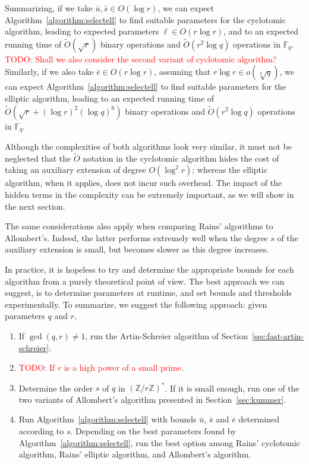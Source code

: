 \documentclass[12pt]{article}
\theoremstyle{plain}
\theoremstyle{definition}
\newcommand{\tildO}{\tilde{O}}
\newcommand{\todo}[1]{\textcolor{red}{TODO: #1}}
\def\Z{\ensuremath{\mathbb{Z}}}
\def\F{\ensuremath{\mathbb{F}}}
\newcounter{algorithm}
\begin{document}
Summarizing, if we take $\bar{u},\bar{s}\in O(\log r)$, we can expect
Algorithm~\ref{algorithm:selectell} to find suitable parameters for
the cyclotomic algorithm, leading to expected parameters $\ell\in
O(r\log r)$, and to an expected running time of $\tildO(\sqrt{r})$
binary operations and $\tildO(r^2\log q)$ operations in
$\F_q$. \todo{Shall we also consider the second variant of cyclotomic
  algorithm?} Similarly, if we also take $\bar{e}\in O(r\log r)$,
assuming that $r\log r\in o(\sqrt[4]{q})$, we can expect
Algorithm~\ref{algorithm:selectell} to find suitable parameters for
the elliptic algorithm, leading to an expected running time of
$\tildO(\sqrt{r}+(\log r)^2(\log q)^6)$ binary operations and
$\tildO(r^2\log q)$ operations in $\F_q$.

Although the complexities of both algorithms look very similar, it
must not be neglected that the $\tildO$ notation in the cyclotomic
algorithm hides the cost of taking an auxiliary extension of degree
$O(\log^2r)$; whereas the elliptic algorithm, when it applies, does
not incur such overhead. The impact of the hidden terms in the
complexity can be extremely important, as we will show in the next
section. 

The same considerations also apply when comparing Rains' algorithms to
Allombert's. Indeed, the latter performs extremely well when the
degree $s$ of the auxiliary extension is small, but becomes slower as
this degree increases.

In practice, it is hopeless to try and determine the appropriate
bounds for each algorithm from a purely theoretical point of view. The
best approach we can suggest, is to determine parameters at runtime,
and set bounds and thresholds experimentally. To summarize, we suggest
the following approach: given parameters $q$ and $r$,
\begin{enumerate}
\item If $\gcd(q,r)\ne 1$, run the Artin-Schreier algorithm of
  Section~\ref{sec:fast-artin-schreier}.
\item \todo{If $r$ is a high power of a small prime}.
\item Determine the order $s$ of $q$ in $(\Z/r\Z)^\ast$. If it is
  small enough, run one of the two variants of Allombert's algorithm
  presented in Section~\ref{sec:kummer}.
\item Run Algorithm~\ref{algorithm:selectell} with bounds $\bar{u}$,
  $\bar{s}$ and $\bar{e}$ determined according to $s$. Depending on
  the best parameters found by Algorithm~\ref{algorithm:selectell},
  run the best option among Rains' cyclotomic algorithm, Rains'
  elliptic algorithm, and Allombert's algorithm.
\end{enumerate}
\end{document}
